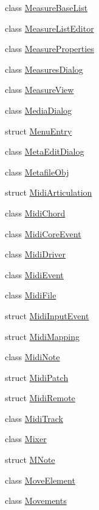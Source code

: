 \begin{DoxyCompactItemize}
class \hyperlink{class_ms_1_1_measure_base_list}{Measure\+Base\+List}
\item 
class \hyperlink{class_ms_1_1_measure_list_editor}{Measure\+List\+Editor}
\item 
class \hyperlink{class_ms_1_1_measure_properties}{Measure\+Properties}
\item 
class \hyperlink{class_ms_1_1_measures_dialog}{Measures\+Dialog}
\item 
class \hyperlink{class_ms_1_1_measure_view}{Measure\+View}
\item 
class \hyperlink{class_ms_1_1_media_dialog}{Media\+Dialog}
\item 
struct \hyperlink{struct_ms_1_1_menu_entry}{Menu\+Entry}
\item 
class \hyperlink{class_ms_1_1_meta_edit_dialog}{Meta\+Edit\+Dialog}
\item 
class \hyperlink{class_ms_1_1_metafile_obj}{Metafile\+Obj}
\item 
struct \hyperlink{struct_ms_1_1_midi_articulation}{Midi\+Articulation}
\item 
class \hyperlink{class_ms_1_1_midi_chord}{Midi\+Chord}
\item 
class \hyperlink{class_ms_1_1_midi_core_event}{Midi\+Core\+Event}
\item 
class \hyperlink{class_ms_1_1_midi_driver}{Midi\+Driver}
\item 
class \hyperlink{class_ms_1_1_midi_event}{Midi\+Event}
\item 
class \hyperlink{class_ms_1_1_midi_file}{Midi\+File}
\item 
struct \hyperlink{struct_ms_1_1_midi_input_event}{Midi\+Input\+Event}
\item 
struct \hyperlink{struct_ms_1_1_midi_mapping}{Midi\+Mapping}
\item 
class \hyperlink{class_ms_1_1_midi_note}{Midi\+Note}
\item 
struct \hyperlink{struct_ms_1_1_midi_patch}{Midi\+Patch}
\item 
struct \hyperlink{struct_ms_1_1_midi_remote}{Midi\+Remote}
\item 
class \hyperlink{class_ms_1_1_midi_track}{Midi\+Track}
\item 
class \hyperlink{class_ms_1_1_mixer}{Mixer}
\item 
struct \hyperlink{struct_ms_1_1_m_note}{M\+Note}
\item 
class \hyperlink{class_ms_1_1_move_element}{Move\+Element}
\item 
class \hyperlink{class_ms_1_1_movements}{Movements}

\end{DoxyCompactItemize}
